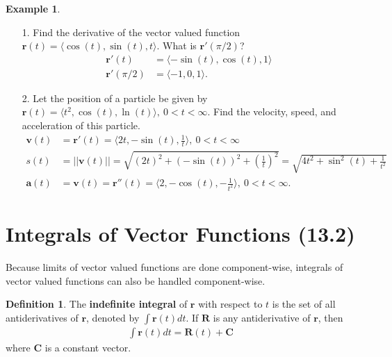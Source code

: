 \documentclass[12pt, letter]{article}
\theoremstyle{plain}
\numberwithin{theorem}{section}
\theoremstyle{definition}
\newtheorem{definition}[theorem]{Definition}
\newtheorem{example}[theorem]{Example}
\begin{document}
\bigskip

\hrulefill

\bigskip

\begin{example}
\begin{itemize}
\item[1.] Find the derivative of the vector valued function $\bm{r}(t) = \langle \cos(t), \sin(t), t \rangle$. What is $\bm{r}'(\pi/2)$?\\
\begin{align*}
\bm{r}'(t) &= \langle -\sin(t), \cos(t), 1 \rangle\\
\bm{r}'(\pi/2) &= \langle -1, 0, 1 \rangle.
\end{align*}
\item[2.] Let the position of a particle be given by $\bm{r}(t) = \langle t^2, \cos(t),\ln(t) \rangle, \ 0<t<\infty$. Find the velocity, speed, and acceleration of this particle.\\
\begin{align*}
\bm{v}(t) &= \bm{r}'(t) = \langle 2t, -\sin(t), \frac{1}{t} \rangle, \ 0<t<\infty\\
s(t) &= ||\bm{v}(t)|| = \sqrt{(2t)^2+(-\sin(t))^2+(\frac{1}{t})^2} = \sqrt{4t^2+\sin^2(t)+\frac{1}{t^2}}\\
\bm{a}(t) &= \bm{v}(t) = \bm{r}''(t) = \langle 2, -\cos(t), -\frac{1}{t^2} \rangle, \ 0<t<\infty.
\end{align*}
\end{itemize}
\end{example}

\newpage


\section{Integrals of Vector Functions (13.2)}

Because limits of vector valued functions are done component-wise, integrals of vector valued functions can also be handled component-wise.

\bigskip

\begin{definition}
The \textbf{indefinite integral} of $\bm{r}$ with respect to $t$ is the set of all antiderivatives of $\bm{r}$, denoted by $\int \bm{r}(t)dt$. If $\bm{R}$ is any antiderivative of $\bm{r}$, then
\begin{align*}
\int \bm{r}(t)dt = \bm{R}(t) + \bm{C}
\end{align*}
where $\bm{C}$ is  a constant vector.
\end{definition}
\end{document}
